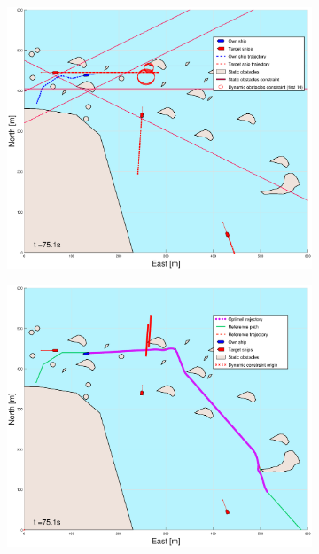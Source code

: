 \begin{figure}[!ht]
\begin{subfigure}[b]{0.499\textwidth}
    \end{subfigure}
    \hfill
    \\
    \begin{subfigure}[b]{0.49\textwidth}
        \centering
        \includegraphics[width=\textwidth]{Images/Figures/skjergard_m_trafikk_NEW/_Simple_1fig1_time=75}
    \end{subfigure}
    \hfill
    \begin{subfigure}[b]{0.499\textwidth}
        \centering
        \includegraphics[width=\textwidth]{Images/Figures/skjergard_m_trafikk_NEW/_Simple_1fig999_time=75}
    \end{subfigure}
    \hfill
\end{figure}%
